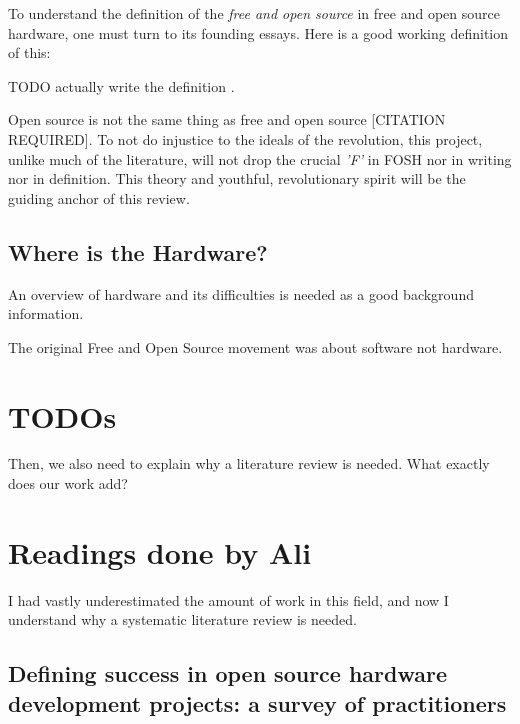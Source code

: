 \documentclass{article}
\begin{document}
To understand the definition of the \textit{free and open source} in free and open source hardware, one must turn to its founding essays. Here is a good working definition of this:

TODO actually write the definition \cite{b0_stallman}.

Open source is not the same thing as free and open source [CITATION REQUIRED]. 
To not do injustice to the ideals of the revolution, this project, unlike much of the literature, will not drop the crucial \textit{'F'} in FOSH nor in writing nor in definition.
This theory and youthful, revolutionary spirit will be the guiding anchor of this review.

\subsection{Where is the Hardware?}
An overview of hardware and its difficulties is needed as a good background information. 

The original Free and Open Source movement was about software not hardware.


\section{TODOs}



Then, we also need to explain why a literature review is needed.
What exactly does our work add?

\section{Readings done by Ali}

I had vastly underestimated the amount of work in this field, and now I understand why a systematic literature review is needed.

\subsection{Defining success in open source hardware development projects: a survey of practitioners}
\cite{p1_def_succ}
\end{document}
